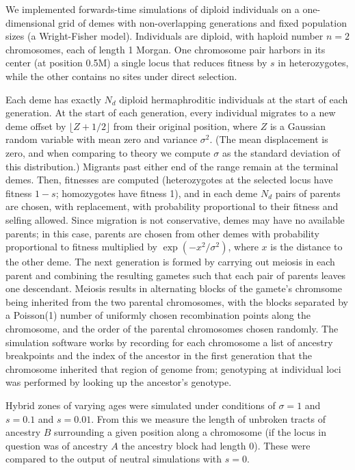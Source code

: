 \documentclass[11pt,letterpaper]{article}
\begin{document}
We implemented forwards-time simulations of diploid individuals on a one-dimensional grid of demes
with non-overlapping generations and fixed population sizes (a Wright-Fisher model). Individuals are diploid, with haploid number $n=2$ chromosomes, each of length 1 Morgan. One chromosome pair harbors in its center (at position 0.5M) a single locus that reduces fitness by $s$ in heterozygotes, while the other contains no sites under direct selection.

Each deme has exactly $N_d$ diploid hermaphroditic individuals at the start of each generation.
At the start of each generation, every individual migrates to a new deme  offset by $\lfloor Z + 1/2 \rfloor$ from their original position,
where $Z$ is a Gaussian random variable with mean zero and variance $\sigma^2$.
(The mean displacement is zero, and when comparing to theory we compute $\sigma$ as the standard deviation of this distribution.)
Migrants past either end of the range remain at the terminal demes.
Then, 
fitnesses are computed (heterozygotes at the selected locus have fitness $1-s$; homozygotes have fitness 1),
and in each deme $N_d$ pairs of parents are chosen, with replacement,
with probability proportional to their fitness and selfing allowed.
Since migration is not conservative, demes may have no available parents;
in this case, parents are chosen from other demes with probability proportional to fitness
multiplied by $\exp(-x^2/\sigma^2)$, where $x$ is the distance to the other deme.
The next generation is formed by carrying out meiosis in each parent
and combining the resulting gametes such that each pair of parents leaves one descendant.
Meiosis results in alternating blocks of the gamete's chromsome
being inherited from the two parental chromosomes,
with the blocks separated by a Poisson(1) number of uniformly chosen recombination points along the chromosome,
and the order of the parental chromosomes chosen randomly.
The simulation software works by recording for each chromosome
a list of ancestry breakpoints and the index of the ancestor in the first generation
that the chromosome inherited that region of genome from;
genotyping at individual loci was performed by looking up the ancestor's genotype.

Hybrid zones of varying ages were simulated under conditions of $\sigma=1$ and $s=0.1$ and $s=0.01$. From this we measure the length of unbroken tracts of ancestry $B$ surrounding a given position along a chromosome (if the locus in question was of ancestry $A$ the ancestry block had length $0$). These were compared to the output of neutral simulations with $s=0$.
\end{document}
